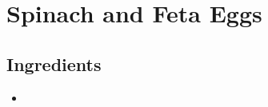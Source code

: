 \thispagestyle{fancy}
\section{Spinach and Feta Eggs}
\AddToShipoutPicture*{\FetaSpinachEggs}

\subsection*{Ingredients}
\begin{multicols}{3}
	\begin{itemize}
		\item 
	\end{itemize}
\end{multicols}
